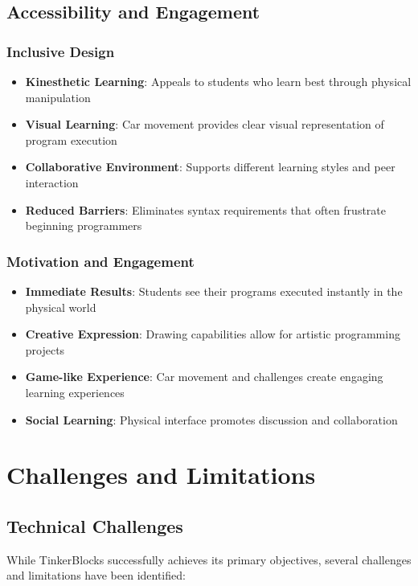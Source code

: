 \subsection{Accessibility and Engagement}

\subsubsection{Inclusive Design}
\begin{itemize}
    \item \textbf{Kinesthetic Learning}: Appeals to students who learn best through physical manipulation
    \item \textbf{Visual Learning}: Car movement provides clear visual representation of program execution
    \item \textbf{Collaborative Environment}: Supports different learning styles and peer interaction
    \item \textbf{Reduced Barriers}: Eliminates syntax requirements that often frustrate beginning programmers
\end{itemize}

\subsubsection{Motivation and Engagement}
\begin{itemize}
    \item \textbf{Immediate Results}: Students see their programs executed instantly in the physical world
    \item \textbf{Creative Expression}: Drawing capabilities allow for artistic programming projects
    \item \textbf{Game-like Experience}: Car movement and challenges create engaging learning experiences
    \item \textbf{Social Learning}: Physical interface promotes discussion and collaboration
\end{itemize}

\section{Challenges and Limitations}

\subsection{Technical Challenges}

While TinkerBlocks successfully achieves its primary objectives, several challenges and limitations have been identified:

